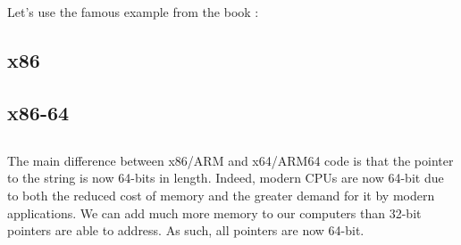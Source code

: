 \section{\HelloWorldSectionName}
\label{sec:helloworld}

Let's use the famous example from the book \KRBook:



\subsection{x86}




\subsection{x86-64}







\subsection{\Conclusion{}}

The main difference between x86/ARM and x64/ARM64 code is that the pointer to the string is now 64-bits in length.
Indeed, modern \ac{CPU}s are now 64-bit due to both the reduced cost of memory and the greater demand for it by modern applications. 
We can add much more memory to our computers than 32-bit pointers are able to address.
As such, all pointers are now 64-bit.



